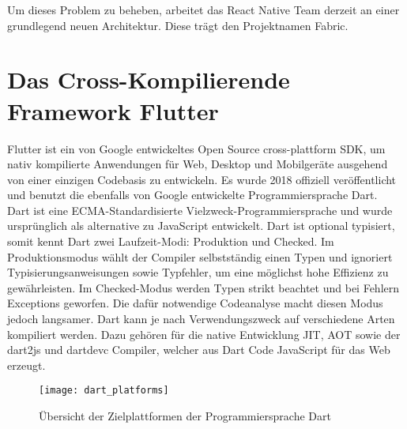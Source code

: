 Um dieses Problem zu beheben, arbeitet das React Native Team derzeit an einer grundlegend neuen Architektur. Diese trägt den Projektnamen Fabric\cite{react_fabric_youtube}.

\newpage
\section{Das Cross-Kompilierende Framework Flutter}

Flutter ist ein von Google entwickeltes Open Source cross-plattform \ac{SDK}, um nativ kompilierte Anwendungen für Web, Desktop und Mobilgeräte ausgehend von einer einzigen Codebasis zu entwickeln. Es wurde 2018 offiziell veröffentlicht und benutzt die ebenfalls von Google entwickelte Programmiersprache Dart\cite{flutter_dev}.\\

Dart ist eine ECMA-Standardisierte Vielzweck-Programmiersprache und wurde ursprünglich als alternative zu JavaScript entwickelt\cite{techcrunch_dart}. Dart ist optional typisiert, somit kennt Dart zwei Laufzeit-Modi: Produktion und Checked. Im Produktionsmodus wählt der Compiler selbstständig einen Typen und ignoriert Typisierungsanweisungen sowie Typfehler, um eine möglichst hohe Effizienz zu gewährleisten. Im Checked-Modus werden Typen strikt beachtet und bei Fehlern Exceptions geworfen. Die dafür notwendige Codeanalyse macht diesen Modus jedoch langsamer. Dart kann je nach Verwendungszweck auf verschiedene Arten kompiliert werden. Dazu gehören für die native Entwicklung \ac{JIT}, \ac{AOT} sowie der dart2js und dartdevc Compiler, welcher aus Dart Code JavaScript für das Web erzeugt\cite{dart_dev}.\\

\begin{figure}[h]
	\texttt{[image: dart\_platforms]}
	\centering
	\caption[Übersicht der Zielplattformen der Programmiersprache Dart]{Übersicht der Zielplattformen der Programmiersprache Dart \cite{dart_dev}}
\end{figure}


